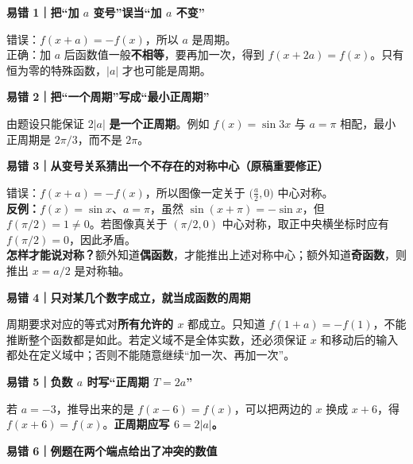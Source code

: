 \clearpage
\begin{trapbox}
\textbf{易错 1｜把“加 $a$ 变号”误当“加 $a$ 不变”}



错误：$f(x+a)=-f(x)$，所以 $a$ 是周期。\\
正确：加 $a$ 后函数值一般\textbf{不相等}，要再加一次，得到 $f(x+2a)=f(x)$。只有恒为零的特殊函数，$|a|$ 才也可能是周期。



\medskip
\end{trapbox}\clearpage\begin{trapbox}\textbf{易错 2｜把“一个周期”写成“最小正周期”}



由题设只能保证 $2|a|$ \textbf{是一个正周期}。例如 $f(x)=\sin3x$ 与 $a=\pi$ 相配，最小正周期是 $2\pi/3$，而不是 $2\pi$。

\medskip
\end{trapbox}\clearpage\begin{trapbox}\textbf{易错 3｜从变号关系猜出一个不存在的对称中心（原稿重要修正）}



错误：$f(x+a)=-f(x)$，所以图像一定关于 $\bigl(\frac a2,0\bigr)$ 中心对称。\\
\textbf{反例：}$f(x)=\sin x$、$a=\pi$，虽然 $\sin(x+\pi)=-\sin x$，但 $f(\pi/2)=1\ne0$。若图像真关于 $(\pi/2,0)$ 中心对称，取正中央横坐标时应有 $f(\pi/2)=0$，因此矛盾。\\
\textbf{怎样才能说对称？}额外知道\textbf{偶函数}，才能推出上述对称中心；额外知道\textbf{奇函数}，则推出 $x=a/2$ 是对称轴。

\medskip
\end{trapbox}\clearpage\begin{trapbox}\textbf{易错 4｜只对某几个数字成立，就当成函数的周期}



周期要求对应的等式对\textbf{所有允许的 $x$} 都成立。只知道 $f(1+a)=-f(1)$，不能推断整个函数都是如此。若定义域不是全体实数，还必须保证 $x$ 和移动后的输入都处在定义域中；否则不能随意继续“加一次、再加一次”。

\medskip
\end{trapbox}\clearpage\begin{trapbox}\textbf{易错 5｜负数 $a$ 时写“正周期 $T=2a$”}



若 $a=-3$，推导出来的是 $f(x-6)=f(x)$，可以把两边的 $x$ 换成 $x+6$，得 $f(x+6)=f(x)$。\textbf{正周期应写 $6=2|a|$。}

\medskip
\end{trapbox}\clearpage\begin{trapbox}\textbf{易错 6｜例题在两个端点给出了冲突的数值}




\end{trapbox}

